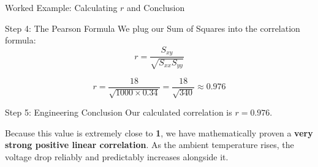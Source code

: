 \begin{frame}{Worked Example: Calculating $r$ and Conclusion}
    \begin{solutioncont}{Step 4: The Pearson Formula}
        We plug our Sum of Squares into the correlation formula:
        $$r = \frac{S_{xy}}{\sqrt{S_{xx} S_{yy}}}$$
        
        $$r = \frac{18}{\sqrt{1000 \times 0.34}} = \frac{18}{\sqrt{340}} \approx 0.976$$
    \end{solutioncont}
    \end{frame}
    \begin{frame}
    
    \begin{solutioncont}{Step 5: Engineering Conclusion}
        Our calculated correlation is \textbf{$r = 0.976$}. 
        
        Because this value is extremely close to \textbf{1}, we have mathematically proven a \textbf{very strong positive linear correlation}. As the ambient temperature rises, the voltage drop reliably and predictably increases alongside it.
    \end{solutioncont}
\end{frame}

